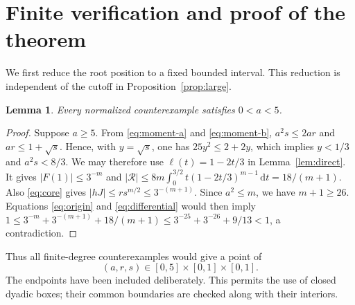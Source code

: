 \documentclass[11pt,reqno]{amsart}
\newtheorem{lem}[thm]{Lemma}
\theoremstyle{definition}
\theoremstyle{remark}
\numberwithin{equation}{section}
\newcommand{\dd}{\,\mathrm d}
\begin{document}
\section{Finite verification and proof of the theorem}\label{sec:finite}

We first reduce the root position to a fixed bounded interval. This reduction is independent of the cutoff in Proposition~\ref{prop:large}.

\begin{lem}\label{lem:compact}
Every normalized counterexample satisfies $0<a<5$.
\end{lem}
\begin{proof}
Suppose $a\ge5$. From \eqref{eq:moment-a} and \eqref{eq:moment-b},
$a^2s\le2ar$ and $ar\le1+\sqrt s$. Hence, with $y=\sqrt s$, one has $25y^2\le2+2y$, which implies $y<1/3$ and $a^2s<8/3$. We may therefore use $\ell(t)=1-2t/3$ in Lemma~\ref{lem:direct}. It gives
$|F(1)|\le3^{-m}$ and
$|\mathcal R|\le8m\int_0^{3/2}t(1-2t/3)^{m-1}\dd t=18/(m+1)$.
Also \eqref{eq:core} gives $|hJ|\le r s^{m/2}\le3^{-(m+1)}$. Since $a^2\le m$, we have $m+1\ge26$. Equations \eqref{eq:origin} and \eqref{eq:differential} would then imply
$1\le3^{-m}+3^{-(m+1)}+18/(m+1)\le3^{-25}+3^{-26}+9/13<1$, a contradiction.
\end{proof}

Thus all finite-degree counterexamples would give a point of
\begin{equation}\label{eq:parameter-box}
 (a,r,s)\in[0,5]\times[0,1]\times[0,1].
\end{equation}
The endpoints have been included deliberately. This permits the use of closed dyadic boxes; their common boundaries are checked along with their interiors.
\end{document}
